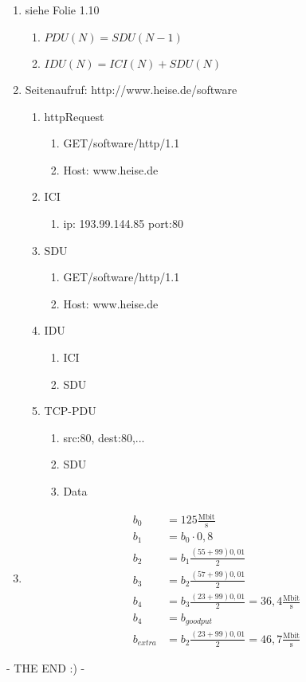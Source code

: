 \subsection{}
\begin{enumerate}
	\item siehe Folie 1.10
	\begin{enumerate}
		\item \(PDU(N)=SDU(N-1)\)
		\item \(IDU(N)=ICI(N)+SDU(N)\)
	\end{enumerate}
	\item Seitenaufruf: http://www.heise.de/software
	\begin{enumerate}
		\item httpRequest
		\begin{enumerate}
			\item  GET/software/http/1.1
			\item Host: www.heise.de
		\end{enumerate}
		\item ICI 
		\begin{enumerate}
			\item ip: 193.99.144.85 port:80
		\end{enumerate}
		\item SDU
		\begin{enumerate}
			\item  GET/software/http/1.1
			\item Host: www.heise.de
		\end{enumerate}
		\item IDU
		\begin{enumerate}
			\item ICI
			\item SDU
		\end{enumerate}
		\item TCP-PDU
		\begin{enumerate}
			\item src:80, dest:80,...
			\item SDU
			\item Data
		\end{enumerate}
	\end{enumerate}
	\item	
	\begin{align*}		
		b_{0}&=125\frac{\text{Mbit}}{\text{s}}\\
		b_{1}&=b_{0}\cdot0,8\\
		b_{2}&=b_{1}\frac{(55+99)0,01}2\\
		b_{3}&=b_{2}\frac{(57+99)0,01}2\\
		b_{4}&=b_{3}\frac{(23+99)0,01}2=36,4\frac{\text{Mbit}}							{\text{s}}\\
		b_{4}&=b_{goodput}\\
		b_{extra}&=b_{2}\frac{(23+99)0,01}2=46,7\frac{\text{Mbit}}						{\text{s}}
	\end{align*}
\end{enumerate}





- THE END  :) - 

\begin{lstlisting}

\end{lstlisting}




